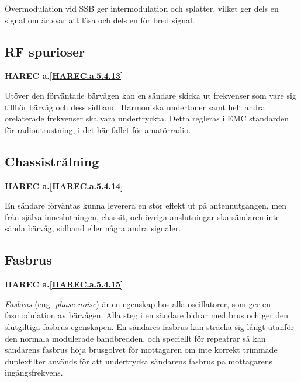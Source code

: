 Övermodulation vid SSB ger intermodulation och splatter, vilket ger dels en
signal om är svår att läsa och dels en för bred signal.

\subsection{RF spurioser}
\textbf{HAREC
  a.\ref{HAREC.a.5.4.13}\label{myHAREC.a.5.4.13}
}

Utöver den förväntade bärvågen kan en sändare skicka ut frekvenser som vare
sig tillhör bärvåg och dess sidband. Harmoniska undertoner samt helt andra
orelaterade frekvenser ska vara undertryckta.
Detta regleras i EMC standarden för radioutrustning, i det här fallet för
amatörradio.

\subsection{Chassistrålning}
\textbf{HAREC
  a.\ref{HAREC.a.5.4.14}\label{myHAREC.a.5.4.14}
}

En sändare förväntas kunna leverera en stor effekt ut på antennutgången, men
från själva inneslutningen, chassit, och övriga anslutningar ska sändaren
inte sända bärvåg, sidband eller några andra signaler.

\subsection{Fasbrus}
\textbf{HAREC
  a.\ref{HAREC.a.5.4.15}\label{myHAREC.a.5.4.15}
}

\emph{Fasbrus} (eng. \emph{phase noise}) är en egenskap hos alla oscillatorer,
som ger en fasmodulation av bärvågen.
Alla steg i en sändare bidrar med brus och ger den slutgiltiga
fasbrus-egenskapen.
En sändares fasbrus kan sträcka sig långt utanför den normala modulerade
bandbredden, och speciellt för repeatrar så kan sändarens fasbrus höja
brusgolvet för mottagaren om inte korrekt trimmade duplexfilter
används för att undertrycka sändarens fasbrus på mottagarens ingångsfrekvens.
